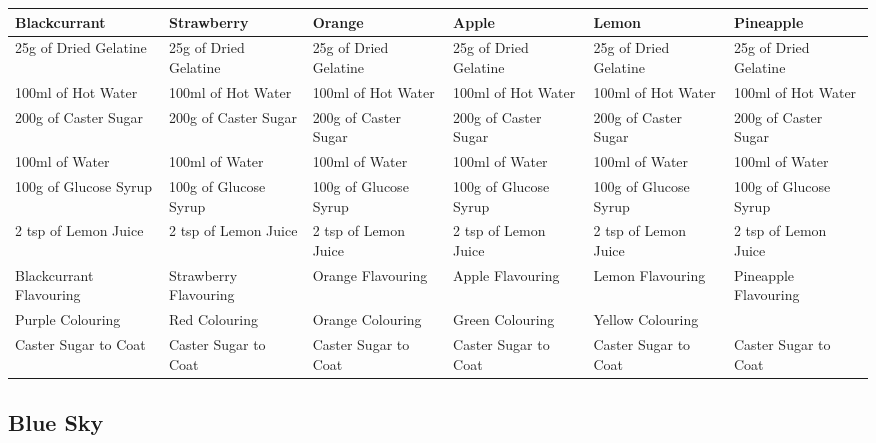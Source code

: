 \documentclass[11pt, english]{article}
\begin{document}
	\begin{table}[h]
	        \scriptsize
	\begin{center}
	\begin{tabular}{p{2.5cm}p{2.5cm}p{2.5cm}p{2.5cm}p{2.5cm}p{2.5cm}}
	        \hline
	        \textbf{Blackcurrant} & \textbf{Strawberry} & \textbf{Orange} & \textbf{Apple} & \textbf{Lemon} & \textbf{Pineapple}\\
	        \hline
	        25g of Dried Gelatine & 25g of Dried Gelatine & 25g of Dried Gelatine & 25g of Dried Gelatine & 25g of Dried Gelatine & 25g of Dried Gelatine\\
	        100ml of Hot Water & 100ml of Hot Water & 100ml of Hot Water & 100ml of Hot Water & 100ml of Hot Water & 100ml of Hot Water\\
	        200g of Caster Sugar & 200g of Caster Sugar & 200g of Caster Sugar & 200g of Caster Sugar & 200g of Caster Sugar & 200g of Caster Sugar\\
	        100ml of Water & 100ml of Water & 100ml of Water & 100ml of Water & 100ml of Water & 100ml of Water\\
	        100g of Glucose Syrup & 100g of Glucose Syrup & 100g of Glucose Syrup & 100g of Glucose Syrup & 100g of Glucose Syrup & 100g of Glucose Syrup\\
	        2 tsp of Lemon Juice & 2 tsp of Lemon Juice & 2 tsp of Lemon Juice & 2 tsp of Lemon Juice & 2 tsp of Lemon Juice & 2 tsp of Lemon Juice\\
	        Blackcurrant Flavouring & Strawberry Flavouring & Orange Flavouring & Apple Flavouring & Lemon Flavouring & Pineapple Flavouring\\
	        Purple Colouring & Red Colouring & Orange Colouring & Green Colouring & Yellow Colouring & \\
	        Caster Sugar to Coat & Caster Sugar to Coat & Caster Sugar to Coat & Caster Sugar to Coat & Caster Sugar to Coat & Caster Sugar to Coat\\
	        \hline
	\end{tabular}
	\end{center}
	\end{table}

\newpage

	\subsection{Blue Sky}
\end{document}
